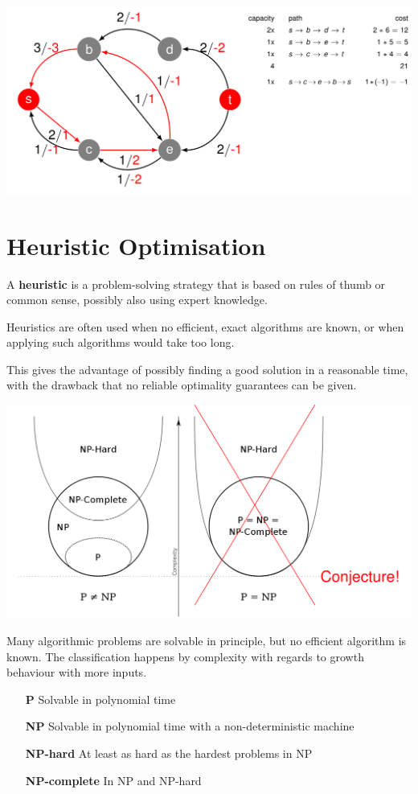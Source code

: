 \documentclass[11pt]{article}
\begin{document}
\begin{center}
	\includegraphics[width=0.7\linewidth]{img/cost_per_flow_backflow}
\end{center}

\section{Heuristic Optimisation}

A \textbf{heuristic} is a problem-solving strategy that is based on rules of thumb or common sense, possibly also using expert knowledge.

Heuristics are often used when no efficient, exact algorithms are known, or when applying such algorithms would take too long.

This gives the advantage of possibly finding a good solution in a reasonable time, with the drawback that no reliable optimality guarantees can be given.

\begin{center}
	\includegraphics[width=0.6\linewidth]{img/pnp}
\end{center}

Many algorithmic problems are solvable in principle, but no efficient algorithm is known. The classification happens by complexity with regards to growth behaviour with more inputs.

\begin{itemize}[leftmargin=*, labelindent=3cm, labelsep=0.5cm]
	\item[\textbf{P}] Solvable in polynomial time
	\item[\textbf{NP}] Solvable in polynomial time with a non-deterministic machine
	\item[\textbf{NP-hard}] At least as hard as the hardest problems in NP
	\item[\textbf{NP-complete}] In NP and NP-hard
\end{itemize}
\end{document}
